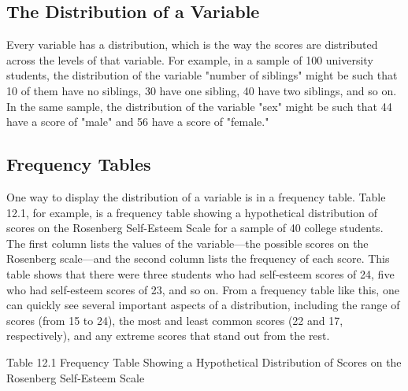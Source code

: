 \subsection{The Distribution of a Variable}



Every variable has a distribution, which is the way the scores are distributed across the levels of that variable. For example, in a sample of 100 university students, the distribution of the variable "number of siblings" might be such that 10 of them have no siblings, 30 have one sibling, 40 have two siblings, and so on. In the same sample, the distribution of the variable "sex" might be such that 44 have a score of "male" and 56 have a score of "female."





\subsection{Frequency Tables}




One way to display the distribution of a variable is in a frequency table. Table 12.1, for example, is a frequency table showing a hypothetical distribution of scores on the Rosenberg Self-Esteem Scale for a sample of 40 college students. The first column lists the values of the variable---the possible scores on the Rosenberg scale---and the second column lists the frequency of each score. This table shows that there were three students who had self-esteem scores of 24, five who had self-esteem scores of 23, and so on. From a frequency table like this, one can quickly see several important aspects of a distribution, including the range of scores (from 15 to 24), the most and least common scores (22 and 17, respectively), and any extreme scores that stand out from the rest.



Table 12.1 Frequency Table Showing a Hypothetical Distribution of Scores on the Rosenberg Self-Esteem Scale


